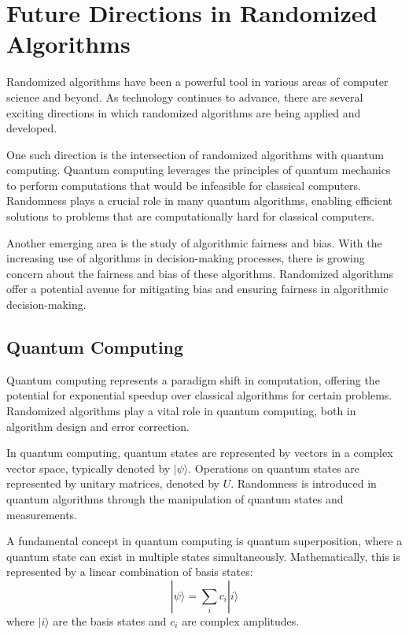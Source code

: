 \documentclass[12pt]{book} %
\begin{document}
\section{Future Directions in Randomized Algorithms}

Randomized algorithms have been a powerful tool in various areas of computer science and beyond. As technology continues to advance, there are several exciting directions in which randomized algorithms are being applied and developed.

One such direction is the intersection of randomized algorithms with quantum computing. Quantum computing leverages the principles of quantum mechanics to perform computations that would be infeasible for classical computers. Randomness plays a crucial role in many quantum algorithms, enabling efficient solutions to problems that are computationally hard for classical computers.

Another emerging area is the study of algorithmic fairness and bias. With the increasing use of algorithms in decision-making processes, there is growing concern about the fairness and bias of these algorithms. Randomized algorithms offer a potential avenue for mitigating bias and ensuring fairness in algorithmic decision-making.

\subsection{Quantum Computing}

Quantum computing represents a paradigm shift in computation, offering the potential for exponential speedup over classical algorithms for certain problems. Randomized algorithms play a vital role in quantum computing, both in algorithm design and error correction.

In quantum computing, quantum states are represented by vectors in a complex vector space, typically denoted by \(|\psi\rangle\). Operations on quantum states are represented by unitary matrices, denoted by \(U\). Randomness is introduced in quantum algorithms through the manipulation of quantum states and measurements.

A fundamental concept in quantum computing is quantum superposition, where a quantum state can exist in multiple states simultaneously. Mathematically, this is represented by a linear combination of basis states:
\[ |\psi\rangle = \sum_{i} c_i |i\rangle \]
where \(|i\rangle\) are the basis states and \(c_i\) are complex amplitudes.
\end{document}
